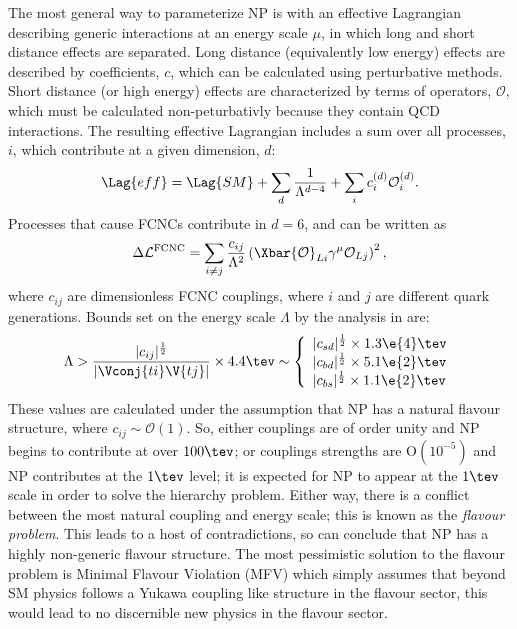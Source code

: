 The most general way to parameterize NP is with an effective Lagrangian describing generic
interactions at an energy scale $\mu$, in which long and short distance effects are separated.
Long distance (equivalently low energy) effects are described by coefficients, $c$, which can be
calculated using perturbative methods.
Short distance (or high energy) effects are characterized by terms of operators, $\mathcal{O}$,
which must be calculated non-peturbativly because they contain QCD interactions.
The resulting effective Lagrangian includes a sum over all processes, $i$, which contribute at a
given dimension, $d$:
\begin{equation}
  \Lag{eff}
  =
  \Lag{SM} + \sum_d\frac1{\Lambda^{d-4}}
  + \sum_ic_i^{(d)}\mathcal{O}_i^{(d)}.
  \label{eq:th:lageff}
\end{equation}
Processes that cause FCNCs contribute in $d=6$, and can be written as
\begin{equation}
  \Delta\mathcal{L}^\mathrm{FCNC}
  =
  \sum_{i\neq j}\frac{c_{ij}}{\Lambda^2}
  \left(\Xbar{\mathcal{O}}_{Li}\gamma^\mu\mathcal{O}_{Lj}\right)^2,
\end{equation}
where $c_{ij}$ are dimensionless FCNC couplings, where $i$ and $j$ are different quark generations.
Bounds set on the energy scale $\Lambda$ by the analysis in  are:
\begin{equation}
  \Lambda > \frac{|c_{ij}|^\frac12}{|\Vconj{ti}\V{tj}|}\times4.4\tev
  \sim
  \left\{
    \begin{array}{l}
      |c_{sd}|^\frac12\times 1.3\e{4}\tev \\
      |c_{bd}|^\frac12\times 5.1\e{2}\tev \\
      |c_{bs}|^\frac12\times 1.1\e{2}\tev \\
    \end{array}\right.
\end{equation}
These values are calculated under the assumption that NP has a natural flavour structure, where
$c_{ij}\sim\mathcal{O}(1)$.
So, either couplings are of order unity and NP begins to contribute at over $100\tev$; or couplings
strengths are $\mathrm{O}(10^{-5})$ and NP contributes at the $1\tev$ level;
it is expected for NP to appear at the $1\tev$ scale in order to solve the hierarchy problem.
Either way, there is a conflict between the most natural coupling and energy scale; this is known
as the \emph{flavour problem}.
This leads to a host of contradictions, so can conclude that NP has a highly non-generic flavour
structure.
The most pessimistic solution to the flavour problem is Minimal Flavour Violation (MFV)
which simply assumes that beyond SM physics follows a Yukawa coupling like structure in the flavour
sector, this would lead to no discernible new physics in the flavour sector.



